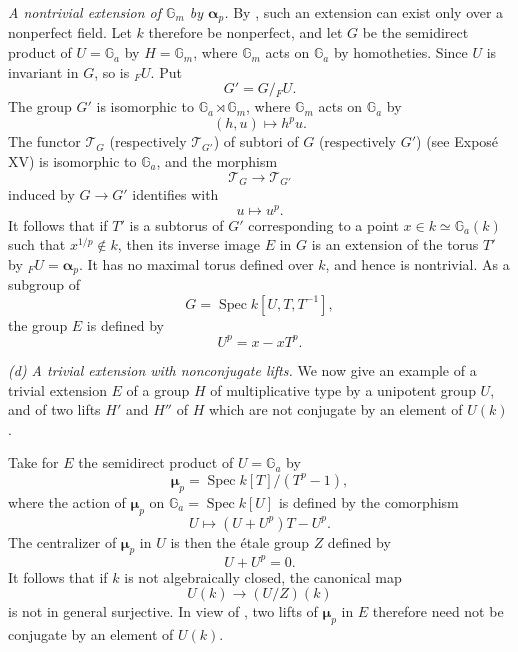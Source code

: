 \smallskip
\noindent
\emph{ A nontrivial extension of \(\mathbb G_m\) by
\(\boldsymbol\alpha_p\).}
By , such an extension can exist only over a
nonperfect field.  Let \(k\) therefore be nonperfect, and let
\(G\) be the semidirect product of \(U=\mathbb G_a\) by
\(H=\mathbb G_m\), where \(\mathbb G_m\) acts on
\(\mathbb G_a\) by homotheties.  Since \(U\) is invariant in
\(G\), so is \({}_{F}U\).  Put
\[
  G'=G/{}_{F}U.
\]
The group \(G'\) is isomorphic to
\(\mathbb G_a\rtimes\mathbb G_m\), where \(\mathbb G_m\) acts on
\(\mathbb G_a\) by
\[
  (h,u)\longmapsto h^p u.
\]
The functor \(\mathscr T_G\) (respectively
\(\mathscr T_{G'}\)) of subtori of \(G\) (respectively \(G'\))
(see Exposé XV) is isomorphic to \(\mathbb G_a\), and the morphism
\[
  \mathscr T_G\longrightarrow\mathscr T_{G'}
\]
induced by \(G\longrightarrow G'\) identifies with
\[
  u\longmapsto u^p.
\]
It follows that if \(T'\) is a subtorus of \(G'\) corresponding
to a point \(x\in k\simeq\mathbb G_a(k)\) such that
\(x^{1/p}\notin k\), then its inverse image \(E\) in \(G\) is an
extension of the torus \(T'\) by
\({}_{F}U=\boldsymbol\alpha_p\).  It has no maximal torus defined
over \(k\), and hence is nontrivial.  As a subgroup of
\[
  G=\operatorname{Spec}k[U,T,T^{-1}],
\]
the group \(E\) is defined by
\[
  U^p=x-xT^p.
\]


\smallskip
\noindent
\emph{(d) A trivial extension with nonconjugate lifts.}
We now give an example of a trivial extension \(E\) of a group
\(H\) of multiplicative type by a unipotent group \(U\), and of
two lifts \(H'\) and \(H''\) of \(H\) which are not conjugate by
an element of \(U(k)\).

Take for \(E\) the semidirect product of \(U=\mathbb G_a\) by
\[
  \boldsymbol\mu_p
  =\operatorname{Spec}k[T]/(T^p-1),
\]
where the action of \(\boldsymbol\mu_p\) on
\(\mathbb G_a=\operatorname{Spec}k[U]\) is defined by the
comorphism
\[
  U\longmapsto(U+U^p)T-U^p.
\]
The centralizer of \(\boldsymbol\mu_p\) in \(U\) is then the
étale group \(Z\) defined by
\[
  U+U^p=0.
\]
It follows that if \(k\) is not algebraically closed, the
canonical map
\[
  U(k)\longrightarrow(U/Z)(k)
\]
is not in general surjective.  In view of , two
lifts of \(\boldsymbol\mu_p\) in \(E\) therefore need not be
conjugate by an element of \(U(k)\).

